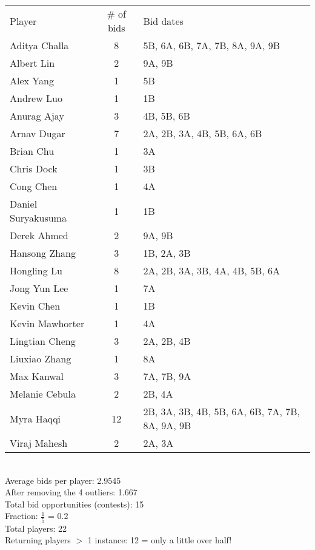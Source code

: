 \documentclass[leqno]{article}
\begin{document}
\begin{tabular}{l c l}
Player & \# of bids & Bid dates\\
Aditya Challa & 8 & 5B, 6A, 6B, 7A, 7B, 8A, 9A, 9B\\
Albert Lin & 2 & 9A, 9B\\
Alex Yang & 1 & 5B\\
Andrew Luo & 1 & 1B\\
Anurag Ajay & 3 & 4B, 5B, 6B\\
Arnav Dugar & 7 & 2A, 2B, 3A, 4B, 5B, 6A, 6B\\
Brian Chu & 1 & 3A\\
Chris Dock & 1 & 3B\\
Cong Chen & 1 & 4A\\
Daniel Suryakusuma & 1 & 1B\\
Derek Ahmed & 2 & 9A, 9B\\
Hansong Zhang & 3 & 1B, 2A, 3B\\
Hongling Lu & 8 & 2A, 2B, 3A, 3B, 4A, 4B, 5B, 6A\\
Jong Yun Lee & 1 & 7A\\
Kevin Chen & 1 & 1B\\
Kevin Mawhorter & 1 & 4A\\
Lingtian Cheng & 3 & 2A, 2B, 4B\\
Liuxiao Zhang & 1 & 8A\\
Max Kanwal & 3 & 7A, 7B, 9A\\
Melanie Cebula & 2 & 2B, 4A\\
Myra Haqqi & 12 & 2B, 3A, 3B, 4B, 5B, 6A, 6B, 7A, 7B, 8A, 9A, 9B\\
Viraj Mahesh & 2 & 2A, 3A\\
\end{tabular}\\

Average bids per player: 2.9545\\
After removing the 4 outliers: 1.667\\
Total bid opportunities (contests): 15\\
Fraction: $\frac{1}{5}$ = 0.2\\
Total players: 22\\
Returning players $>$ 1 instance: 12 = only a little over half!\\
\end{document}
